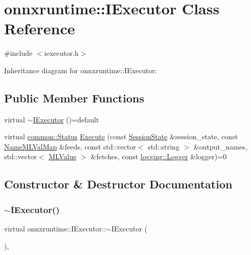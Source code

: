 \hypertarget{classonnxruntime_1_1IExecutor}{}\section{onnxruntime\+:\+:I\+Executor Class Reference}
\label{classonnxruntime_1_1IExecutor}


{\ttfamily \#include $<$iexecutor.\+h$>$}



Inheritance diagram for onnxruntime\+:\+:I\+Executor\+:
\subsection*{Public Member Functions}
\begin{DoxyCompactItemize}
\item 
virtual \mbox{\hyperlink{classonnxruntime_1_1IExecutor_ad20a9131a88e8deb7b3658c3be36c74d}{$\sim$\+I\+Executor}} ()=default
\item 
virtual \mbox{\hyperlink{classonnxruntime_1_1common_1_1Status}{common\+::\+Status}} \mbox{\hyperlink{classonnxruntime_1_1IExecutor_a72794c9d86c407a835858c739ac4fb3e}{Execute}} (const \mbox{\hyperlink{classonnxruntime_1_1SessionState}{Session\+State}} \&session\+\_\+state, const \mbox{\hyperlink{namespaceonnxruntime_a48b01f0410ec8d693dbd40d1132bd66c}{Name\+M\+L\+Val\+Map}} \&feeds, const std\+::vector$<$ std\+::string $>$ \&output\+\_\+names, std\+::vector$<$ \mbox{\hyperlink{classonnxruntime_1_1MLValue}{M\+L\+Value}} $>$ \&fetches, const \mbox{\hyperlink{classonnxruntime_1_1logging_1_1Logger}{logging\+::\+Logger}} \&logger)=0
\end{DoxyCompactItemize}


\subsection{Constructor \& Destructor Documentation}
\mbox{\label{classonnxruntime_1_1IExecutor_ad20a9131a88e8deb7b3658c3be36c74d}} 
\subsubsection{\texorpdfstring{$\sim$\+I\+Executor()}{~IExecutor()}}
{\footnotesize\ttfamily virtual onnxruntime\+::\+I\+Executor\+::$\sim$\+I\+Executor (\begin{DoxyParamCaption}{ }\end{DoxyParamCaption})\hspace{0.3cm}{\ttfamily [virtual]}, {\ttfamily [default]}}



